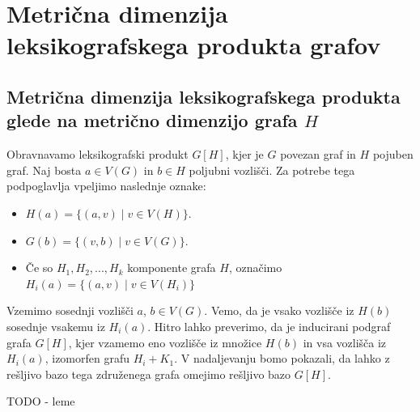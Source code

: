 \documentclass[mat1, tisk]{fmfdelo}
\newcommand{\1}{(1, 1, ..., 1)}
\newcommand{\2}{(2, 2, ..., 2)}
\begin{document}
\section{Metrična dimenzija leksikografskega produkta grafov}\label{s:mdim_prod}
 



\subsection{Metrična dimenzija leksikografskega produkta glede na metrično dimenzijo grafa $H$} \label{ss:mdim_komp_prod}

Obravnavamo leksikografski produkt $G[H]$, kjer je $G$ povezan graf in $H$ pojuben 
graf. Naj bosta $a \in V(G)$ in $b \in H$ poljubni vozlišči. Za potrebe tega 
podpoglavlja vpeljimo naslednje oznake:
\begin{itemize}
    \item $H(a) = \{ (a, v) \; | \; v \in V(H) \}$.
    \item $G(b) = \{ (v, b) \; | \; v \in V(G) \}$.
    \item Če so $H_1, H_2, ..., H_k$ komponente grafa $H$, označimo 
    $H_i(a) = \{ (a, v) \; | \; v \in V(H_i) \}$
\end{itemize}

Vzemimo sosednji vozlišči $a$, $b \in V(G)$. Vemo, da je vsako vozlišče iz $H(b)$ 
sosednje vsakemu iz $H_i(a).$ 
Hitro lahko preverimo, da je inducirani podgraf grafa $G[H]$, kjer vzamemo eno 
vozlišče iz množice $H(b)$ in vsa vozlišča iz $H_i(a)$, izomorfen grafu $H_i + K_1.$ 
V nadaljevanju bomo pokazali, da lahko z rešljivo bazo tega združenega grafa
omejimo rešljivo bazo $G[H]$.

TODO - leme


        
\end{document}
